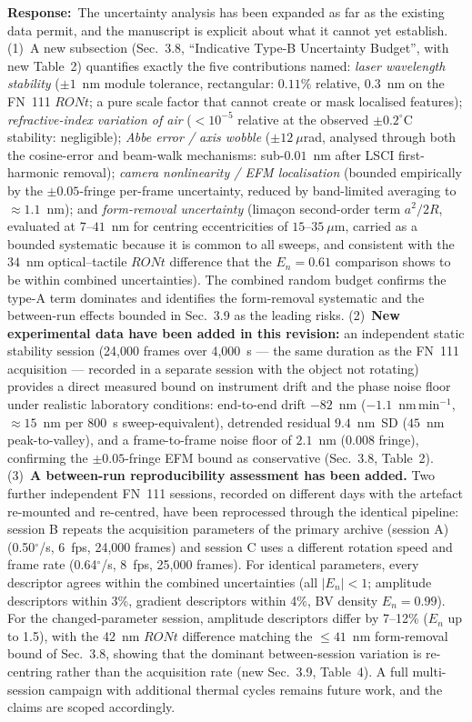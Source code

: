 \documentclass[11pt,a4paper]{article}
\newcommand{\response}{\par\noindent\textbf{Response:}\ }
\begin{document}
\response The uncertainty analysis has been expanded as far as the existing data permit, and the manuscript is explicit about what it cannot yet establish. (1)~A new subsection (Sec.~3.8, ``Indicative Type-B Uncertainty Budget'', with new Table~2) quantifies exactly the five contributions named: \emph{laser wavelength stability} ($\pm1$~nm module tolerance, rectangular: $0.11\%$ relative, $0.3$~nm on the FN~111 $RONt$; a pure scale factor that cannot create or mask localised features); \emph{refractive-index variation of air} ($<10^{-5}$ relative at the observed $\pm0.2^{\circ}$C stability: negligible); \emph{Abbe error / axis wobble} ($\pm12~\mu$rad, analysed through both the cosine-error and beam-walk mechanisms: sub-$0.01$~nm after LSCI first-harmonic removal); \emph{camera nonlinearity / EFM localisation} (bounded empirically by the $\pm0.05$-fringe per-frame uncertainty, reduced by band-limited averaging to $\approx1.1$~nm); and \emph{form-removal uncertainty} (lima\c{c}on second-order term $a^2/2R$, evaluated at $7$--$41$~nm for centring eccentricities of $15$--$35~\mu$m, carried as a bounded systematic because it is common to all sweeps, and consistent with the $34$~nm optical--tactile $RONt$ difference that the $E_n=0.61$ comparison shows to be within combined uncertainties). The combined random budget confirms the type-A term dominates and identifies the form-removal systematic and the between-run effects bounded in Sec.~3.9 as the leading risks. (2)~\textbf{New experimental data have been added in this revision:} an independent static stability session (24,000 frames over 4,000~s --- the same duration as the FN~111 acquisition --- recorded in a separate session with the object not rotating) provides a direct measured bound on instrument drift and the phase noise floor under realistic laboratory conditions: end-to-end drift $-82$~nm ($-1.1$~nm\,min$^{-1}$, $\approx15$~nm per 800~s sweep-equivalent), detrended residual $9.4$~nm~SD ($45$~nm peak-to-valley), and a frame-to-frame noise floor of $2.1$~nm ($0.008$ fringe), confirming the $\pm0.05$-fringe EFM bound as conservative (Sec.~3.8, Table~2). (3)~\textbf{A between-run reproducibility assessment has been added.} Two further independent FN~111 sessions, recorded on different days with the artefact re-mounted and re-centred, have been reprocessed through the identical pipeline: session B repeats the acquisition parameters of the primary archive (session A) (0.50$^\circ$/s, 6~fps, 24,000 frames) and session C uses a different rotation speed and frame rate (0.64$^\circ$/s, 8~fps, 25,000 frames). For identical parameters, every descriptor agrees within the combined uncertainties (all $|E_n|<1$; amplitude descriptors within 3\%, gradient descriptors within 4\%, BV density $E_n=0.99$). For the changed-parameter session, amplitude descriptors differ by 7--12\% ($E_n$ up to 1.5), with the 42~nm $RONt$ difference matching the $\leq41$~nm form-removal bound of Sec.~3.8, showing that the dominant between-session variation is re-centring rather than the acquisition rate (new Sec.~3.9, Table~4). A full multi-session campaign with additional thermal cycles remains future work, and the claims are scoped accordingly.
\end{document}
